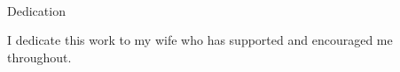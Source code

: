 

\renewcommand{\baselinestretch}{2}
\small\normalsize
\hbox{\ }

\vspace{-.65in}

\begin{center}
\large{Dedication}
\end{center}

\noindent I dedicate this work to my wife who has supported and encouraged me throughout.
